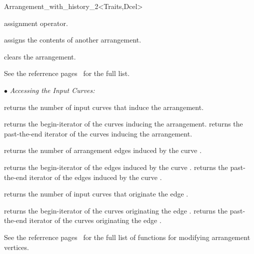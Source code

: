 \begin{ccRefClass}{Arrangement_with_history_2<Traits,Dcel>}

    {assignment operator.}

    {assigns the contents of another arrangement.}

    {clears the arrangement.}


\ccAccessFunctions

See the  referrence 
pages~ for the full list.


$\bullet$ {\sl Accessing the Input Curves:}

    {returns the number of input curves that induce the arrangement.}

    {returns the begin-iterator of the curves inducing the arrangement.}
\ccGlue    
{}
    {returns the past-the-end iterator of the curves inducing the arrangement.}

    {returns the number of arrangement edges induced by the curve .}

    {returns the begin-iterator of the edges induced by the curve .}
\ccGlue
{}
    {returns the past-the-end iterator of the edges induced by the curve .}
    
    {returns the number of input curves that originate the edge .}

    {returns the begin-iterator of the curves originating the edge .}
\ccGlue
{}
    {returns the past-the-end iterator  of the curves originating the edge 
     .}
    
\ccModifiers

See the  referrence
pages~ for the full
list of functions for modifying arrangement vertices.


\end{ccRefClass}
